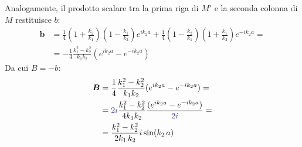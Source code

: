 \documentclass[../../FisicaTeorica.tex]{subfiles}
\begin{document}
Analogamente, il prodotto scalare tra la prima riga di $M'$ e la seconda colonna di $M$ restituisce $b$:
\begin{align*}
\bm{b}&=\frac{1}{4}\left(1+\frac{k_2}{k_1}\right)\left(1-\frac{k_1}{k_2}\right) e^{ik_2 a} + \frac{1}{4}\left(1-\frac{k_2}{k_1}\right)\left(1+\frac{k_1}{k_2}\right)e^{-ik_2 a}=\\
&=-\frac{1}{4} \frac{k_1^2-k_2^2}{k_1 k_2}\left(e^{ik_2 a}-e^{-ik_2 a}\right)
\end{align*}
Da cui $B=-b$:
\begin{align*}
\bm{B}&=\frac{1}{4}\frac{k_1^2-k_2^2}{k_1k_2}(e^{ik_2a}-e^{-ik_2 a})=\\
&=\textcolor{Blue}{2i}\frac{k_1^2-k_2^2}{4k_1k_2} \frac{(e^{ik_2a}-e^{-ik_2a})}{\textcolor{Blue}{2i}} =\\
&=\frac{k_1^2-k_2^2}{2k_1\,k_2}i\sin(k_2\,a)
\end{align*}
\end{document}
